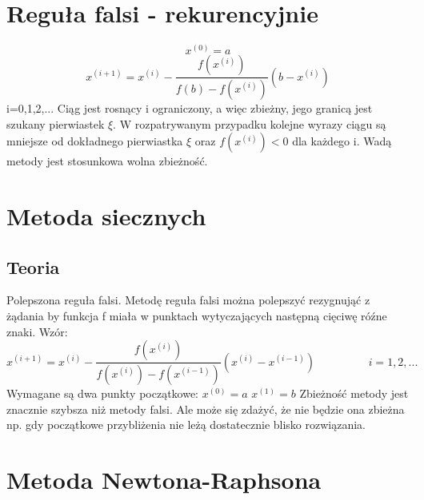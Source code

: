 \documentclass[a4paper]{article}
\begin{document}
\section{Reguła falsi - rekurencyjnie}
$$x^{(0)} = a$$
$$x^{(i+1)} = x^{(i)} - \frac{f(x^{(i)})}{f(b)-f(x^{(i)})}(b-x^{(i)})$$
i=0,1,2,... \newline
Ciąg jest rosnący i ograniczony, a więc zbieżny, jego granicą jest szukany pierwiastek $\xi$. W rozpatrywanym przypadku kolejne wyrazy ciągu są mniejsze od dokładnego pierwiastka $\xi$  oraz $f(x^{(i)}) < 0$ dla każdego i. 
\newline
Wadą metody jest stosunkowa wolna zbieżność. 


\section{Metoda siecznych}
\subsection{Teoria}
Polepszona reguła falsi.\newline
Metodę reguła falsi można polepszyć rezygnująć z żądania by funkcja f miała w punktach wytyczających następną cięciwę róźne znaki.\newline
Wzór:
$$x^{(i+1)} = x^{(i)} - \frac{f(x^{(i)})}{f(x^{(i)})-f(x^{(i-1)})}(x^{(i)}-x^{(i-1)})  \hspace{2cm} i=1,2,...$$ 
Wymagane są dwa punkty początkowe: \newline
$x^{(0)} = a$ \newline
$x^{(1)} = b$ \newline
Zbieżność metody jest znacznie szybsza niż metody falsi. Ale może się zdażyć, że nie będzie ona zbieżna np. gdy początkowe przybliżenia nie leżą dostatecznie blisko rozwiązania.

\section{Metoda Newtona-Raphsona}
\end{document}
